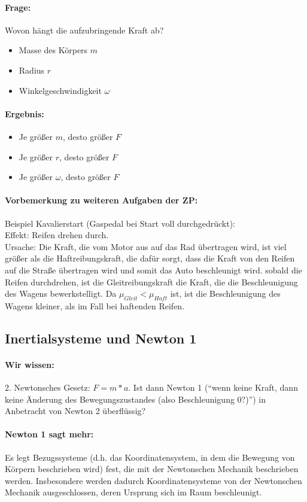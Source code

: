 \documentclass[12pt]{article}
\numberwithin{equation}{subsection}
\begin{document}
	\paragraph{Frage:}
	Wovon hängt die aufzubringende Kraft ab?
	\begin{itemize}
		\item Masse des Körpers $ m $
		\item Radius $ r $
		\item Winkelgeschwindigkeit $ \omega $
	\end{itemize}
	\paragraph{Ergebnis:}
	\begin{itemize}
		\item Je größer $ m $, desto größer $ F $
		\item Je größer $ r $, desto größer $ F $
		\item Je größer $ \omega $, desto größer $ F $
	\end{itemize}
	\paragraph{Vorbemerkung zu weiteren Aufgaben der ZP:}
	Beispiel Kavalierstart (Gaspedal bei Start voll durchgedrückt):\\
	Effekt: Reifen drehen durch.\\
	Ursache: Die Kraft, die vom Motor aus auf das Rad übertragen wird, ist viel größer als die Haftreibungskraft, die dafür sorgt, dass die Kraft von den Reifen auf die Straße übertragen wird und somit das Auto beschleunigt wird. sobald die Reifen durchdrehen, ist die Gleitreibungskraft die Kraft, die die Beschleunigung des Wagens bewerkstelligt. Da $ \mu_{Gleit} < \mu_{Haft} $ ist, ist die Beschleunigung des Wagens kleiner, als im Fall bei haftenden Reifen.
	
	\subsection{Inertialsysteme und Newton 1}
	\paragraph{Wir wissen:}
	2. Newtonsches Gesetz: $ F = m*a $. Ist dann Newton 1 (``wenn keine Kraft, dann keine Änderung des Bewegungszustandes (also Beschleunigung 0?)'') in Anbetracht von Newton 2 überflüssig?
	\paragraph{Newton 1 sagt mehr:} Es legt Bezugssysteme (d.h. das Koordinatensystem, in dem die Bewegung von Körpern beschrieben wird) fest, die mit der Newtonschen Mechanik beschrieben werden. Insbesondere werden dadurch Koordinatensysteme von der Newtonschen Mechanik ausgeschlossen, deren Ursprung sich im Raum beschleunigt.
	
\end{document}
